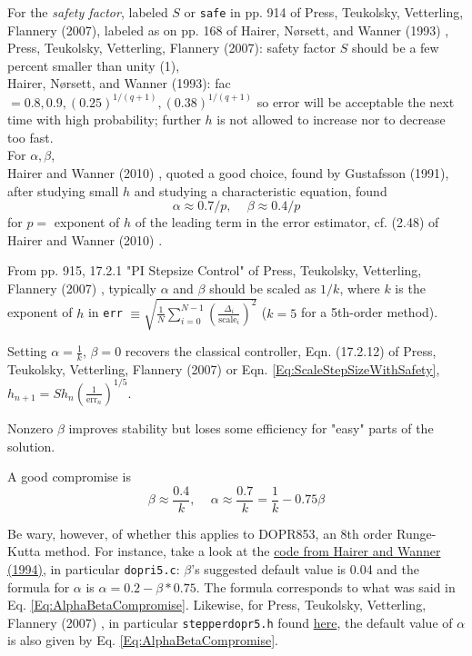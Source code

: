 \documentclass[10pt]{amsart}
\begin{document}
\begin{multicols*}{2}
For the \emph{safety factor}, labeled $S$ or \verb|safe| in pp. 914 of Press, Teukolsky, Vetterling, Flannery (2007)\cite{PTVF2007}, labeled as  on pp. 168 of Hairer, N\o rsett, and Wanner (1993) \cite{HNW1993}, \\
Press, Teukolsky, Vetterling, Flannery (2007)\cite{PTVF2007}: safety factor $S$ should be a few percent smaller than unity (1), \\
Hairer, N\o rsett, and Wanner (1993)\cite{HNW1993}: fac $ = 0.8, 0.9, (0.25)^{1/(q+1)}, (0.38)^{1/(q+1)}$ so error will be acceptable the next time with high probability; further $h$ is not allowed to increase nor to decrease too fast. \\

For $\alpha, \beta$, \\
Hairer and Wanner (2010) \cite{HaWa2010}, quoted a good choice, found by Gustafsson (1991), after studying small $h$ and studying a characteristic equation, found
\begin{equation}
	\alpha \approx 0.7 / p, \quad \, \beta \approx 0.4 / p
\end{equation}
for $p = $ exponent of $h$ of the leading term in the error estimator, cf. (2.48) of Hairer and Wanner (2010) \cite{HaWa2010}.

From pp. 915, 17.2.1 "PI Stepsize Control" of Press, Teukolsky, Vetterling, Flannery (2007) \cite{PTVF2007}, typically $\alpha$ and $\beta$ should be scaled as $1/k$, where $k$ is the exponent of $h$ in \verb|err| $\equiv \sqrt{ \frac{1}{N} \sum_{i=0}^{N-1} \left( \frac{\Delta_i}{ \text{scale}_i} \right)^2 }$ ($k=5$ for a 5th-order method).

Setting $\alpha = \frac{1}{k}$, $\beta=0$ recovers the classical controller, Eqn. (17.2.12) of Press, Teukolsky, Vetterling, Flannery (2007) \cite{PTVF2007} or Eqn. \ref{Eq:ScaleStepSizeWithSafety}, $h_{n+1} = Sh_n \left( \frac{1}{\text{err}_n} \right)^{1/5}$.

Nonzero $\beta$ improves stability but loses some efficiency for "easy" parts of the solution.

A good compromise is
\begin{equation}\label{Eq:AlphaBetaCompromise}
	\beta \approx \frac{0.4}{k}, \quad \, \alpha \approx \frac{0.7}{k} = \frac{1}{k} - 0.75 \beta
\end{equation}

Be wary, however, of whether this applies to DOPR853, an 8th order Runge-Kutta method. For instance, take a look at the \href{https://www.unige.ch/~hairer/software.html}{code from Hairer and Wanner (1994)}, in particular \verb|dopri5.c|: $\beta$'s suggested default value is 0.04 and the formula for $\alpha$ is $\alpha = 0.2 - \beta * 0.75$. The formula corresponds to what was said in Eq. \ref{Eq:AlphaBetaCompromise}. Likewise, for Press, Teukolsky, Vetterling, Flannery (2007) \cite{PTVF2007}, in particular \verb|stepperdopr5.h| found \href{https://github.com/blackstonep/Numerical-Recipes/blob/master/stepperdopr5.h}{here}, the default value of $\alpha$ is also given by Eq. \ref{Eq:AlphaBetaCompromise}.


\end{multicols*}
\end{document}
